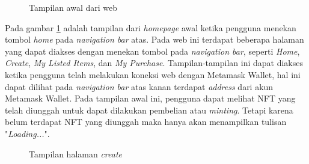   \begin{figure} [H] \centering
  \caption{Tampilan awal dari web}
  \label{fig:homepage}
  \end{figure}

  Pada gambar \ref{fig:homepage} adalah tampilan dari \emph{homepage} awal ketika pengguna menekan tombol \emph{home} pada \emph{navigation bar} atas. Pada web ini terdapat beberapa halaman yang dapat diakses dengan menekan tombol pada \emph{navigation bar}, seperti \emph{Home}, \emph{Create}, \emph{My Listed Items}, dan \emph{My Purchase}. Tampilan-tampilan ini dapat diakses ketika pengguna telah melakukan koneksi web dengan Metamask Wallet, hal ini dapat dilihat pada \emph{navigation bar} atas kanan terdapat \emph{address} dari akun Metamask Wallet. Pada tampilan awal ini, pengguna dapat melihat NFT yang telah diunggah untuk dapat dilakukan pembelian atau \emph{minting}. Tetapi karena belum terdapat NFT yang diunggah maka hanya akan menampilkan tulisan "\emph{Loading...}".
   
  \begin{figure} [H] \centering
    \caption{Tampilan halaman \emph{create}}
    \label{fig:createpage}
    \end{figure}

